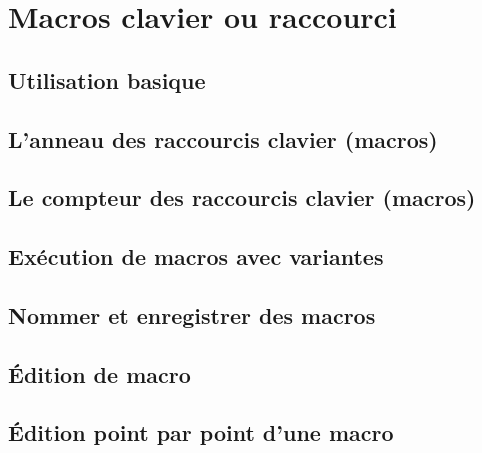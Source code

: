 \chapter{Macros clavier ou raccourci}\label{chap14}
\section{Utilisation basique}\label{chap14sec1}
\section{L'anneau des raccourcis clavier (macros)}\label{chap14sec2}
\section{Le compteur des raccourcis clavier (macros)}\label{chap14sec3}
\section{Exécution de macros avec variantes}\label{chap14sec4}
\section{Nommer et enregistrer des macros}\label{chap14sec5}
\section{\'Edition de macro}\label{chap14sec6}
\section{\'Edition point par point d'une macro}\label{chap14sec7}
